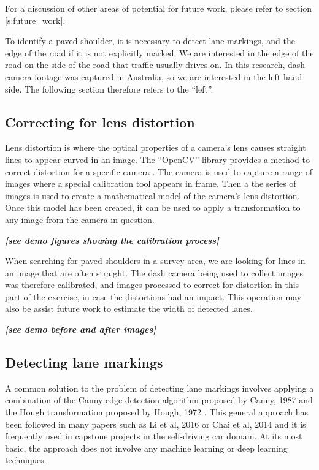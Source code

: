 \documentclass[11pt,twoside]{report}
\newcommand{\remark}[1]{{\bf \em [\marginpar{$\Leftarrow$}#1]}}
\begin{document}
For a discussion of other areas of potential for future work, please refer to section \ref{s:future_work}.

To identify a paved shoulder, it is necessary to detect lane markings, and the edge of the road if it is not explicitly marked.  We are interested in the edge of the road on the side of the road that traffic usually drives on.  In this research, dash camera footage was captured in Australia, so we are interested in the left hand side.  The following section therefore refers to the ``left''.


\subsection{Correcting for lens distortion}

Lens distortion is where the optical properties of a camera's lens causes straight lines to appear curved in an image.  The ``OpenCV'' library provides a method to correct distortion for a specific camera \cite{distortion}.  The camera is used to capture a range of images where a special calibration tool appears in frame.  Then a the series of images is used to create a mathematical model of the camera's lens distortion.  Once this model has been created, it can be used to apply a transformation to any image from the camera in question.

\remark{see demo figures showing the calibration process}

When searching for paved shoulders in a survey area, we are looking for lines in an image that are often straight.  The dash camera being used to collect images was therefore calibrated, and images processed to correct for distortion in this part of the exercise, in case the distortions had an impact.  This operation may also be assist future work to estimate the width of detected lanes.

\remark{see demo before and after images}


\subsection{Detecting lane markings}

A common solution to the problem of detecting lane markings involves applying a combination of the Canny edge detection algorithm proposed by Canny, 1987 \cite{canny} and the Hough transformation proposed by Hough, 1972 \cite{hough}.  This general approach has been followed in many papers such as  Li et al, 2016 \cite{canny_example} or Chai et al, 2014 \cite{canny_example2} and it is frequently used in capstone projects in the self-driving car domain.  At its most basic, the approach does not involve any machine learning or deep learning techniques.
\end{document}
